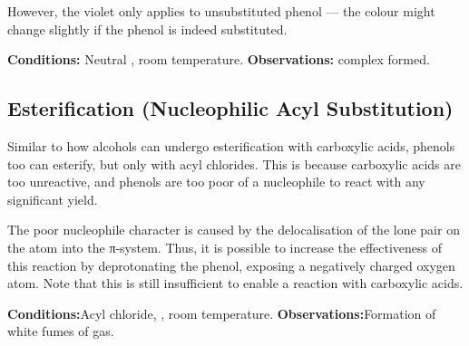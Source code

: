 			However, the violet only applies to unsubstituted phenol –– the colour might change slightly if the phenol is
			indeed substituted.

			\vspace{1.5em}
			\vbox{\textbf{Conditions:}	\tabto{35mm}Neutral , room temperature.}
			\vbox{\textbf{Observations:}\tabto{35mm} complex formed.}






		\subsection{Esterification (Nucleophilic Acyl Substitution)}

			Similar to how alcohols can undergo esterification with carboxylic acids, phenols too can esterify, but only with acyl
			chlorides. This is because carboxylic acids are too unreactive, and phenols are too poor of a nucleophile to react with any
			significant yield.

			The poor nucleophile character is caused by the delocalisation of the lone pair on the  atom into the π-system. Thus,
			it is possible to increase the effectiveness of this reaction by deprotonating the phenol, exposing a negatively charged oxygen
			atom. Note that this is still insufficient to enable a reaction with carboxylic acids.


			\vspace{1.5em}
			\vbox{\textbf{Conditions:}\tabto{35mm}Acyl chloride, , room temperature.}
			\vbox{\textbf{Observations:}\tabto{35mm}Formation of white fumes of  gas.}




